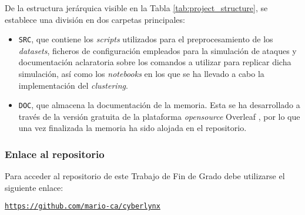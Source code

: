 \newpage

De la estructura jerárquica visible en la Tabla \ref{tab:project_structure}, se establece una división en dos carpetas principales: 

\begin{itemize}
    \item \texttt{SRC}, que contiene los \textit{scripts} utilizados para el preprocesamiento de los \textit{datasets}, ficheros de configuración empleados para la simulación de ataques y documentación aclaratoria sobre los comandos a utilizar para replicar dicha simulación, así como los \textit{notebooks} en los que se ha llevado a cabo la implementación del \textit{clustering}. \\
    \item  \texttt{DOC}, que almacena la documentación de la memoria. Esta se ha desarrollado a través de la versión gratuita de la plataforma \textit{opensource} Overleaf \cite{overleaf}, por lo que una vez finalizada la memoria ha sido alojada en el repositorio.
\end{itemize}

\subsubsection*{Enlace al repositorio}

Para acceder al repositorio de este Trabajo de Fin de Grado debe utilizarse el siguiente enlace:

\begin{center}
    \texttt{\url{https://github.com/mario-ca/cyberlynx}}
\end{center}




        
